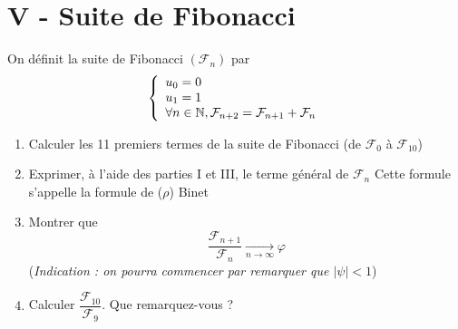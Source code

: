 \section*{V - Suite de Fibonacci}
On définit la suite de Fibonacci $(\mathcal{F}_n)$ par 
$$\left\lbrace \begin{array}{l}
u_0 = 0 \\
u_1 = 1\\
\forall n \in \mathbb{N}, \mathcal{F}_{n+2} = \mathcal{F}_{n+1} + \mathcal{F}_n
\end{array}
\right.$$
\begin{enumerate}
\item Calculer les 11 premiers termes de la suite de Fibonacci (de $\mathcal{F}_0$ à $\mathcal{F}_{10}$)
\item Exprimer, à l'aide des parties I et III, le terme général de $\mathcal{F}_n$ Cette formule s'appelle la formule de ($\rho$) Binet
\item Montrer que $$\dfrac{\mathcal{F}_{n+1}}{\mathcal{F}_n} \underset{n \rightarrow \infty}{\longrightarrow} \varphi$$
(\emph{Indication : on pourra commencer par remarquer que $|\psi| < 1$})
\item Calculer $\dfrac{\mathcal{F}_{10}}{\mathcal{F}_{9}}$. Que remarquez-vous ?
\end{enumerate}
